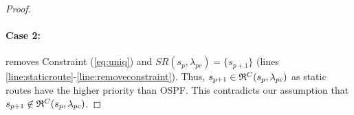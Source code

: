 \begin{proof}
\paragraph{Case 2:}  
 removes Constraint (\ref{eq:uniq}) 
and $SR(s_p, \lambda_{pc}) = \{s_{p+1}\}$ (lines \ref{line:staticroute}-\ref{line:removeconstraint}). 
Thus, $s_{p+1} \in \mathfrak{R}^C(s_{p}, \lambda_{pc})$ as static routes 
have the higher priority than OSPF. This contradicts our assumption
that $s_{p+1} \not\in \mathfrak{R}^C(s_{p}, \lambda_{pc})$. 
\end{proof}